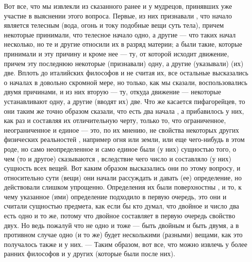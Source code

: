 \documentclass{article}
\begin{document}
Вот все, что мы извлекли из сказанного ранее и у мудрецов, принявших уже участие в выяснении этого вопроса. Первые, из них признавали
\footnotemark[16]
, что начало является телесным (вода, огонь и току подобные вещи суть тела), причем некоторые принимали, что телесное начало одно, а другие — что таких начал несколько, но те и другие относили их в разряд материи; а были такие, которые принимали и эту причину и кроме нее — ту, от которой исходит движение, причем эту последнюю некоторые (признавали) одну, а другие (указывали) (их) две. Вплоть до италийских философов 
и не считая их, все остальные высказались о началах в довольно скромной мере, но только, как мы сказали, воспользовались двумя причинами, и из них вторую — ту, откуда движение — некоторые устанавливают одну, а другие (вводят их) две. Что же касается пифагорейцев, то они таким же точно образом сказали, что есть два начала
\footnotemark[17]
, а прибавилось у них, как раз и составляя их отличительную черту, только то, что ограниченное, неограниченное и единое — это, по их мнению, не свойства некоторых других физических реальностей
\footnotemark[18]
, например огня или земли, или еще чего-нибудь в этом роде, но само неопределенное и само единое были (у них) сущностью того, о чем (то и другое) сказываются
\footnotemark[19]
, вследствие чего число и составляло (у них) сущность всех вещей. Вот каким образом высказались они по этому вопросу, и относительно сути (вещи)
\footnotemark[20]
они начали рассуждать и давать (ее) определение, но действовали слишком упрощенно. Определения их были поверхностны
\footnotemark[21]
, и то, к чему указанное (ими) определение подходило в первую очередь, это они и считали сущностью предмета, как если бы кто думал, что двойное и число два есть одно и то же, потому что двойное составляет в первую очередь свойство двух. Но ведь пожалуй что не одно и тоже — быть двойным и быть двумя, а в противном случае одно (и то же) будет несколькими (разными) вещами, как это получалось также и у них. — Таким образом, вот все, что можно извлечь у более ранних философов и у других
\footnotemark[22]
(которые были после них).
\end{document}
